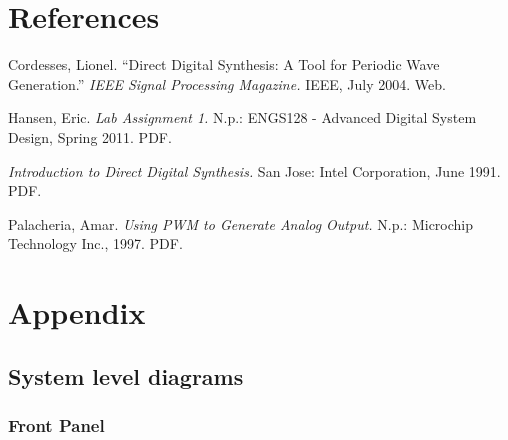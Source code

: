 \documentclass{article}
\begin{document}
\newpage
\section{References}


  \begin{thebibliography}{9}

  	Cordesses, Lionel.
  	``Direct Digital Synthesis: A Tool for Periodic Wave Generation.''
  	\emph{IEEE Signal Processing Magazine.}
  	IEEE,
  	July 2004. 
  	Web.  	

  	Hansen, Eric.
  	\emph{Lab Assignment 1.}
  	N.p.:
  	ENGS128 - Advanced Digital System Design, Spring 2011.
  	PDF.

  	\emph{Introduction to Direct Digital Synthesis.}
  	San Jose: Intel Corporation,
  	June 1991.
  	PDF.

  	Palacheria, Amar.
  	\emph{Using PWM to Generate Analog Output.}
  	N.p.: Microchip Technology Inc.,
  	1997.
  	PDF.

  \end{thebibliography}

\newpage
\section{Appendix}
  	\listoffigures
  	\listoftables

  	\newpage
  	\subsection{System level diagrams}

    \subsubsection{Front Panel}
      
\end{document}
